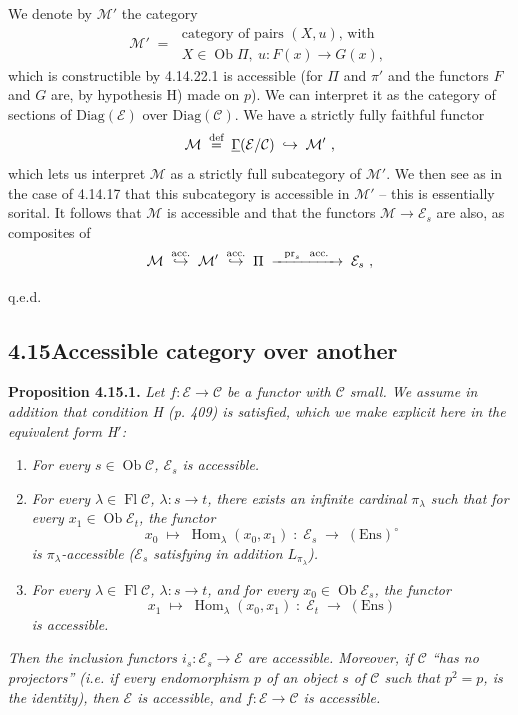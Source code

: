 \documentclass[11pt]{article}
\newcommand{\printedpage}[1]{\marginpar{\footnotesize p.~#1}}
\newcommand{\msp}[1]{\marginpar{\footnotesize [#1]}}
\newcommand{\cE}{\mathcal{E}}
\newcommand{\cC}{\mathcal{C}}
\newcommand{\cM}{\mathcal{M}}
\newcommand{\Ob}{\operatorname{Ob}}
\newcommand{\Fl}{\operatorname{Fl}}
\newcommand{\Hom}{\operatorname{Hom}}
\newcommand{\Ens}{\mathrm{Ens}}
\newcommand{\pr}{\mathrm{pr}}
\newcommand{\defeq}{\overset{\text{\upshape def}}{=}}
\begin{document}
\printedpage{161}

\msp{page 424}
We denote by $\cM'$ the category
\[
\cM' \;=\;
\begin{array}{l}
\text{category of pairs } (X,u)\text{, with}\\
X \in \Ob\Pi,\ u : F(x) \longrightarrow G(x),
\end{array}
\] %
which is constructible by 4.14.22.1 is accessible (for $\Pi$ and $\pi'$ and the functors $F$ and $G$ are, by hypothesis H) made on $p$). We can interpret it as the category of sections %
of $\mathrm{Diag}(\cE)$ over $\mathrm{Diag}(\cC)$. We have a strictly fully faithful functor
\[
\cM \;\defeq\; \underline{\Gamma}(\cE/\cC) \;\hookrightarrow\; \cM'\ ,
\]
which lets us interpret $\cM$ as a strictly full subcategory of $\cM'$. We then see as in the case of 4.14.17 that this subcategory is accessible in $\cM'$ -- this is essentially sorital. It follows that $\cM$ is accessible and that the functors $\cM \longrightarrow \cE_s$ are also, as composites of
\[
\cM \;\overset{\text{\upshape acc.}}{\hookrightarrow}\; \cM' \;\overset{\text{\upshape acc.}}{\hookrightarrow}\; \Pi \;\xrightarrow{\ \ \pr_s\ \ \text{\upshape acc.}\ \ }\; \cE_s\ ,
\]

\hfill q.e.d.

\msp{page 425}

\subsection*{4.15\quad Accessible category over another}

\textbf{Proposition 4.15.1.} \textit{Let $f : \cE \longrightarrow \cC$ be a functor with $\cC$ small. We assume in addition that condition H (p. 409) is satisfied, which we make explicit here in the equivalent form H$'$:}
\begin{enumerate}
\item[\textit{H 1)}] \textit{For every $s \in \Ob\cC$, $\cE_s$ is accessible.}
\item[\textit{H 2)}] \textit{For every $\lambda \in \Fl\cC$, $\lambda : s \longrightarrow t$, there exists an infinite cardinal $\pi_\lambda$ such that for every $x_1 \in \Ob\cE_t$, the functor}
\[
x_0 \;\longmapsto\; \Hom_\lambda(x_0,x_1) \;:\; \cE_s \;\longrightarrow\; (\Ens)^\circ
\]
\textit{is $\pi_\lambda$-accessible ($\cE_s$ satisfying in addition $L_{\pi_\lambda}$).}
\item[\textit{H 3)}] \textit{For every $\lambda \in \Fl\cC$, $\lambda : s \longrightarrow t$, and for every $x_0 \in \Ob\cE_s$, the functor}
\[
x_1 \;\longmapsto\; \Hom_\lambda(x_0,x_1) \;:\; \cE_t \;\longrightarrow\; (\Ens)
\]
\textit{is accessible.}
\end{enumerate}
\textit{Then the inclusion functors $i_s : \cE_s \longrightarrow \cE$ are accessible. Moreover, if $\cC$ ``has no projectors'' (i.e. if every endomorphism $p$ of an object $s$ of $\cC$ such that $p^2 = p$, is the identity), then $\cE$ is accessible, and $f : \cE \longrightarrow \cC$ is accessible.}
\end{document}
